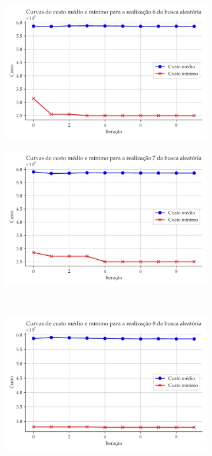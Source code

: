 \documentclass[a4paper, 12pt]{article}
\begin{document}
\begin{figure}[!ht]
\begin{subfigure}{0.4\textwidth}
\end{subfigure}
\hfill
\\
\centering
\begin{subfigure}{0.4\textwidth}
    \includegraphics[width=\textwidth]{figuras/iteracao-6.pdf}
\end{subfigure}
\begin{subfigure}{0.4\textwidth}
    \includegraphics[width=\textwidth]{figuras/iteracao-7.pdf}
\end{subfigure}
\hfill
\\
\centering
\begin{subfigure}{0.4\textwidth}
    \includegraphics[width=\textwidth]{figuras/iteracao-8.pdf}

\end{subfigure}
\end{figure}
\end{document}

